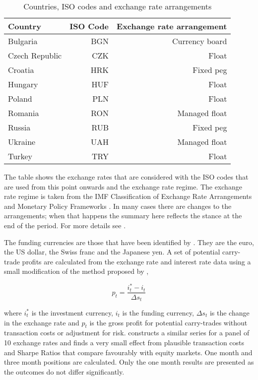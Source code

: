 \documentclass[12pt, a4paper, oneside]{article}\usepackage[]{graphicx}\usepackage[]{color}
\begin{document}
\begin{table}[t]
\begin{threeparttable}
\centering
\begin{tabular}{lrr}
  \hline
Country & ISO Code & Exchange rate arrangement\\
  \hline
Bulgaria & BGN & Currency board\\
Czech Republic & CZK & Float\\
Croatia & HRK & Fixed peg\\
Hungary & HUF & Float \\
Poland & PLN & Float\\
Romania & RON & Managed float\\
Russia & RUB & Fixed peg\\
Ukraine & UAH & Managed float\\
Turkey & TRY & Float\\
   \hline
\end{tabular}
\begin{tablenotes}
\small
\item The table shows the exchange rates that are considered with the ISO codes that are used from this point onwards and the exchange rate regime.  The exchange rate regime is taken from the IMF Classification of Exchange Rate Arrangements and Monetary Policy Frameworks \citet{IMFregime}. In many cases there are changes to the arrangements; when that happens the summary here reflects the stance at the end of the period.  For more details see \citet{Hayward2014}.  
\end{tablenotes}
\caption{Countries, ISO codes and exchange rate arrangements}
\label{tabref:exrate}
\end{threeparttable}
\end{table}

The funding currencies are those that have been identified by \citet{FTS}. They are the euro, the US dollar, the Swiss franc and the Japanese yen. A set of potential carry-trade profits are calculated from the exchange rate and interest rate data using a small modification of the method proposed by \citet{BrunnermeierCarry},   

\begin{equation}
p_t = \frac{i^*_t - i_t}{\Delta s_t}
\end{equation} 

where $i_t^*$ is the investment currency, $i_t$ is the funding currency, $\Delta s_t$ is the change in the exchange rate and $p_t$ is the gross profit for potential carry-trades without transaction costs or adjustment for risk.  \citet{Burnside2010} constructs a similar series for a panel of 10 exchange rates and finds a very small effect from plausible transaction costs and Sharpe Ratios that compare favourably with equity markets.  One month and three month positions are calculated. Only the one month results are presented as the outcomes do not differ significantly. 
\end{document}
